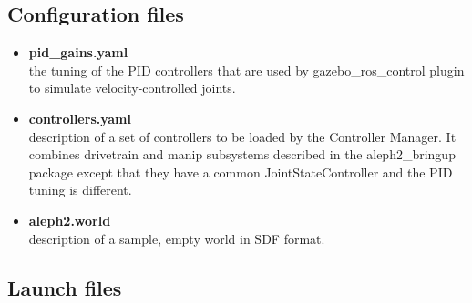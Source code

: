\documentclass[english,inz,shortabstract]{iithesis}
\newcommand{\val}[1]{\textbf{\textsf{#1}}}
\begin{document}
\subsection{Configuration files}

	\begin{itemize}
		\item \val{pid\_gains.yaml}\\
		the tuning of the PID controllers that are used by \textsf{gazebo\_ros\_control} plugin to simulate velocity-controlled joints.
		\item \val{controllers.yaml}\\
		description of a set of controllers to be loaded by the Controller Manager. It combines \textsf{drivetrain} and \textsf{manip} subsystems described in the  \textsf{aleph2\_bringup} package except that they have a common \textsf{JointStateController} and the PID tuning is different.
		\item \val{aleph2.world}\\
		description of a sample, empty world in SDF format.
	\end{itemize}

\subsection{Launch files}
\end{document}
